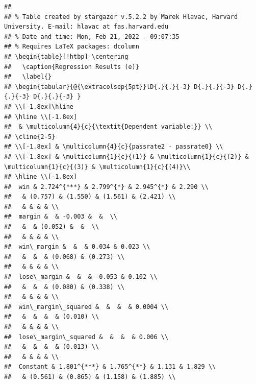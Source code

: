 \documentclass[
  12pt,
  landscape]{article}
\begin{document}
\begin{verbatim}
## 
## % Table created by stargazer v.5.2.2 by Marek Hlavac, Harvard University. E-mail: hlavac at fas.harvard.edu
## % Date and time: Mon, Feb 21, 2022 - 09:07:35
## % Requires LaTeX packages: dcolumn 
## \begin{table}[!htbp] \centering 
##   \caption{Regression Results (e)} 
##   \label{} 
## \begin{tabular}{@{\extracolsep{5pt}}lD{.}{.}{-3} D{.}{.}{-3} D{.}{.}{-3} D{.}{.}{-3} } 
## \\[-1.8ex]\hline 
## \hline \\[-1.8ex] 
##  & \multicolumn{4}{c}{\textit{Dependent variable:}} \\ 
## \cline{2-5} 
## \\[-1.8ex] & \multicolumn{4}{c}{passrate2 - passrate0} \\ 
## \\[-1.8ex] & \multicolumn{1}{c}{(1)} & \multicolumn{1}{c}{(2)} & \multicolumn{1}{c}{(3)} & \multicolumn{1}{c}{(4)}\\ 
## \hline \\[-1.8ex] 
##  win & 2.724^{***} & 2.799^{*} & 2.945^{*} & 2.290 \\ 
##   & (0.757) & (1.550) & (1.561) & (2.421) \\ 
##   & & & & \\ 
##  margin &  & -0.003 &  &  \\ 
##   &  & (0.052) &  &  \\ 
##   & & & & \\ 
##  win\_margin &  &  & 0.034 & 0.023 \\ 
##   &  &  & (0.068) & (0.273) \\ 
##   & & & & \\ 
##  lose\_margin &  &  & -0.053 & 0.102 \\ 
##   &  &  & (0.080) & (0.338) \\ 
##   & & & & \\ 
##  win\_margin\_squared &  &  &  & 0.0004 \\ 
##   &  &  &  & (0.010) \\ 
##   & & & & \\ 
##  lose\_margin\_squared &  &  &  & 0.006 \\ 
##   &  &  &  & (0.013) \\ 
##   & & & & \\ 
##  Constant & 1.801^{***} & 1.765^{**} & 1.131 & 1.829 \\ 
##   & (0.561) & (0.865) & (1.158) & (1.885) \\ 

\end{verbatim}
\end{document}
